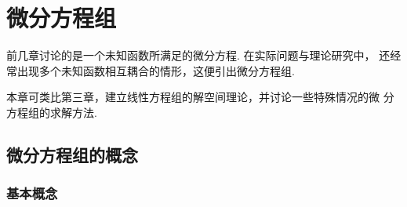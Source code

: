 \chapter{微分方程组}
前几章讨论的是一个未知函数所满足的微分方程. 在实际问题与理论研究中，
还经常出现多个未知函数相互耦合的情形，这便引出微分方程组.

本章可类比第三章，建立线性方程组的解空间理论，并讨论一些特殊情况的微
分方程组的求解方法.

\section{微分方程组的概念}\label{sec:4.1}

\subsection{基本概念}

